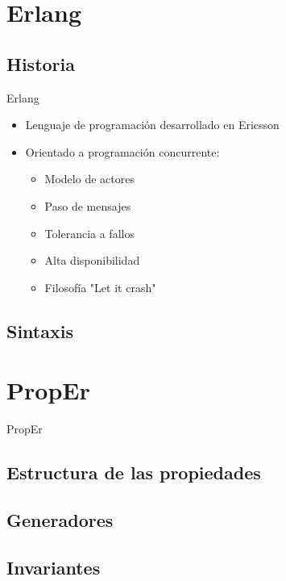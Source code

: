 \documentclass{beamer}
\begin{document}
  \section{Erlang}
    \subsection{Historia}
    \begin{frame}{Erlang}
      \begin{itemize}
        \item Lenguaje de programación desarrollado en Ericsson
        \item Orientado a programación concurrente:
        \begin{itemize}
          \item Modelo de actores
          \item Paso de mensajes
          \item Tolerancia a fallos
          \item Alta disponibilidad
          \item Filosofía "Let it crash"
        \end{itemize}
      \end{itemize}
    \end{frame}
    \subsection{Sintaxis}
    \begin{frame}
    \end{frame}
  \section{PropEr}
    \begin{frame}{PropEr}

    \end{frame}
    \subsection{Estructura de las propiedades}
    \subsection{Generadores}
    \subsection{Invariantes}
\end{document}
